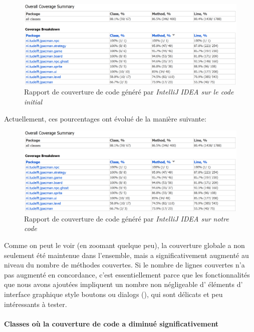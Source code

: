 \documentclass[12pt, openany]{report}
\begin{document}
\begin{figure}[h]
	\centering
	\includegraphics[width=\textwidth]{Images/InitialCoverage}
	\caption{\label{InitialCoverage} Rapport de couverture de code généré par \textit{IntelliJ IDEA sur le code initial}}
\end{figure}


Actuellement, ces pourcentages ont évolué de la manière suivante:

\begin{figure}[h]
	\centering
	\includegraphics[width=\textwidth]{Images/MergedCoverage}
	\caption{\label{MergedCoverage} Rapport de couverture de code généré par \textit{IntelliJ IDEA sur notre code}}
\end{figure}

Comme on peut le voir (en zoomant quelque peu), la couverture globale a non seulement été maintenue dans l'ensemble, mais a significativement augmenté au niveau du nombre de méthodes couvertes.
Si le nombre de lignes couvertes n'a pas augmenté en concordance, c'est essentiellement parce que les fonctionnalités que nous avons ajoutées impliquent un nombre non négligeable d' éléments d' interface graphique style boutons ou \og dialogs \fg(), qui sont délicats et peu intéressants à tester.


\paragraph{Classes où la couverture de code a diminué significativement}
\end{document}
